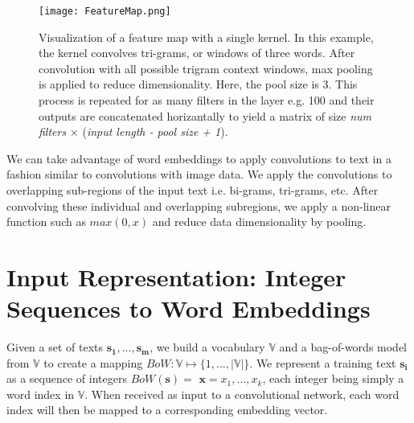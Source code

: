 \begin{figure}[H]
\caption{Visualization of a feature map with a single kernel. In this example, the kernel convolves tri-grams, or windows of three words.
After convolution with all possible trigram context windows, max pooling is applied to reduce dimensionality.
Here, the pool size is 3. This process is repeated for as many filters in the layer e.g. 100 and their outputs are
concatenated horizantally to yield a matrix of size \textit{num filters} $\times$ (\textit{input length - pool size + 1}).}
\centering
\texttt{[image: FeatureMap.png]}
\end{figure}

We can take advantage of word embeddings to apply convolutions to text in a fashion similar to convolutions with
image data. We apply the convolutions to overlapping sub-regions of the input text i.e. bi-grams, tri-grams, etc.
After convolving these individual and overlapping subregions, we apply a non-linear function such as $max(0,x)$ and reduce data dimensionality
by pooling.


\section{Input Representation: Integer Sequences to Word Embeddings}
Given a set of texts $\bm{s_1},...,\bm{s_m}$, we build a vocabulary $\mathbb{V}$ and a bag-of-words model from $\mathbb{V}$ to create a mapping $BoW:\mathbb{V} \mapsto \{1,...,|\mathbb{V}|\}$.
We represent a training text $\bm{s_i}$ as a sequence of integers $BoW(\bm{s})=$ $\bm{x} = x_1,...,x_k$, each integer being simply a word index
in $\mathbb{V}$. When received as input to a convolutional network, each word index will then be mapped to a corresponding embedding vector.


